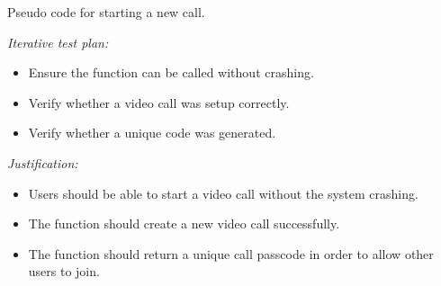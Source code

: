 \begin{algorithm}[H]
\caption{Pseudo code for starting a new call.}
\sffamily

\begin{algorithmic}[1]
    \State{}

     
     

     

    \State{}



    \State{}
  \EndFunction
\end{algorithmic}

\end{algorithm}
\mdseries

\textit{Iterative test plan: }  \\

\begin{itemize}

\item{Ensure the function can be called without crashing.}

\item{Verify whether a video call was setup correctly.}

\item{Verify whether a unique code was generated.}

\end{itemize}

\textit{Justification: } \\

\begin{itemize}

\item Users should be able to start a video call without the system crashing.\\

\item The function should create a new video call successfully.\\

\item The function should return a unique call passcode in order to allow other users to join.\\

\end{itemize}

